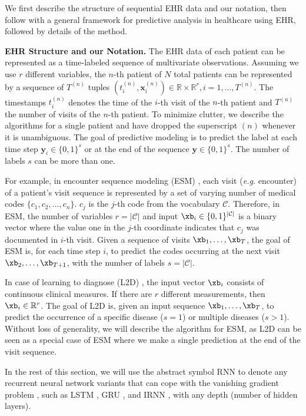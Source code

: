 We first describe the structure of sequential EHR data and our notation, then follow with a general framework for predictive analysis in healthcare using EHR, followed by details of the \alg method.

\textbf{EHR Structure and our Notation.} The EHR data of each patient can be represented as a time-labeled sequence of multivariate observations. Assuming we use $r$ different variables, the $n$-th patient of $N$ total patients can be represented by a sequence of $T^{(n)}$ tuples $(t_i^{(n)}, \mathbf{x}_i^{(n)}) \in \mathbb{R}\times\mathbb{R}^{r} , i=1, \ldots, T^{(n)}$. The timestamps $t_i^{(n)}$ denotes the time of the $i$-th visit of the $n$-th patient and $T^{(n)}$ the number of visits of the $n$-th patient. To minimize clutter, we describe the algorithms for a single patient and have dropped the superscript $(n)$ whenever it is unambiguous. The goal of predictive modeling is to predict the label at each time step $\mathbf{y}_i \in \{0,1\}^{s}$ or at the end of the sequence $\mathbf{y} \in \{0,1\}^{s}$. The number of labels $s$ can be more than one.

For example, in encounter sequence modeling (ESM) \cite{choi2015doctor}, each visit (\textit{e.g.} encounter) of a patient's visit sequence is represented by a set of varying number of medical codes $\{c_1, c_2, \ldots, c_n\}$. $c_j$ is the $j$-th code from the vocabulary $\mathcal{C}$. Therefore, in ESM, the number of variables $r=|\mathcal{C}|$ and input $\xb_i \in \{0,1\}^{|\mathcal{C}|}$ is a binary vector where the value one in the $j$-th coordinate indicates that $c_j$ was documented in $i$-th visit. Given a sequence of visits $\xb_1, \ldots, \xb_T$, the goal of ESM is, for each time step $i$, to predict the codes occurring at the next visit $\xb_2, \ldots, \xb_{T+1}$, with the number of labels $s=|\mathcal{C}|$.

In case of learning to diagnose (L2D) \cite{lipton2015learning}, the input vector $\xb_i$ consists of continuous clinical measures. If there are $r$ different measurements, then $\xb_i \in \mathbb{R}^{r}$. The goal of L2D is, given an input sequence $\xb_1, \ldots, \xb_T$, to predict the occurrence of a specific disease ($s=1$) or multiple diseases ($s > 1$). 
Without loss of generality, we will describe the algorithm for ESM, as L2D can be seen as a special case of ESM where we make a single prediction at the end of the visit sequence.

In the rest of this section, we will use the abstract symbol $\mathrm{RNN}$ to denote any recurrent neural network variants that can cope with the vanishing gradient problem \cite{bengio1994learning}, such as LSTM \cite{hochreiter1997long}, GRU \cite{cho2014learning}, and IRNN \cite{le2015simple}, with any depth (number of hidden layers). 

